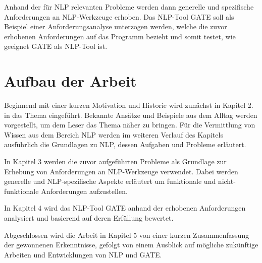\documentclass[12pt]{report}
\begin{document}
Anhand der für NLP relevanten Probleme werden dann generelle und spezifische Anforderungen an NLP-Werkzeuge erhoben. 
Das NLP-Tool GATE soll als Beispiel einer Anforderungsanalyse unterzogen werden, welche die zuvor erhobenen Anforderungen auf das Programm bezieht und somit testet, wie geeignet GATE als NLP-Tool ist.

\section{Aufbau der Arbeit}
Beginnend mit einer kurzen Motivation und Historie wird zunächst in Kapitel 2. in das Thema eingeführt. Bekannte Ansätze und Beispiele aus dem Alltag werden vorgestellt, um dem Leser das Thema näher zu bringen. Für die Vermittlung von Wissen aus dem Bereich NLP werden im weiteren Verlauf des Kapitels ausführlich die Grundlagen zu NLP, dessen Aufgaben und Probleme erläutert.

In Kapitel 3 werden die zuvor aufgeführten Probleme als Grundlage zur Erhebung von Anforderungen an NLP-Werkzeuge verwendet. Dabei werden generelle und NLP-spezifische Aspekte erläutert um funktionale und nicht-funktionale Anforderungen aufzustellen.

In Kapitel 4 wird das NLP-Tool GATE anhand der erhobenen Anforderungen analysiert und basierend auf deren Erfüllung bewertet. 

Abgeschlossen wird die Arbeit in Kapitel 5 von einer kurzen Zusammenfassung der gewonnenen Erkenntnisse, gefolgt von einem Ausblick auf mögliche zukünftige Arbeiten und Entwicklungen von NLP und GATE. 
\end{document}
